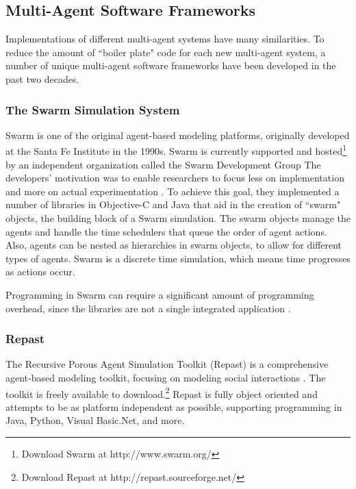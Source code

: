 \subsection{Multi-Agent Software Frameworks}
Implementations of different multi-agent systems have many similarities.
To reduce the amount of ``boiler plate" code for each new multi-agent system, a number of unique multi-agent software frameworks have been developed in the past two decades.

\subsubsection{The Swarm Simulation System}
Swarm is one of the original agent-based modeling platforms, originally developed at the Santa Fe Institute in the 1990s.
Swarm is currently supported and hosted\footnote{Download Swarm at http://www.swarm.org/} by an independent organization called the Swarm Development Group
The developers' motivation was to enable researchers to focus less on implementation and more on actual experimentation \cite{minar1996swarm}.
To achieve this goal, they implemented a number of libraries in Objective-C and Java that aid in the creation of ``swarm" objects, the building block of a Swarm simulation.
The swarm objects manage the agents and handle the time schedulers that queue the order of agent actions.
Also, agents can be nested as hierarchies in swarm objects, to allow for different types of agents.
Swarm is a discrete time simulation, which means time progresses as actions occur.

Programming in Swarm can require a significant amount of programming overhead, since the libraries are not a single integrated application \cite{kleinbreve}.

\subsubsection{Repast}
The Recursive Porous Agent Simulation Toolkit (Repast) is a comprehensive agent-based modeling toolkit, focusing on modeling social interactions \cite{collier2003ref}.
The toolkit is freely available to download.\footnote{Download Repast at http://repast.sourceforge.net/}
Repast is fully object oriented and attempts to be as platform independent as possible, supporting programming in Java, Python, Visual Basic.Net, and more.

